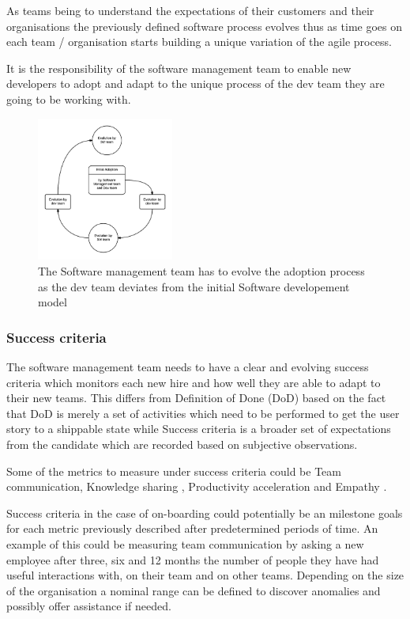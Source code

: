 \documentclass[12pt,conference]{IEEEtran}
\begin{document}
As teams being to understand the expectations of their customers and their organisations the previously defined software process evolves thus as time goes on each team / organisation starts building a unique variation of the agile process.

It is the responsibility of the software management team to enable new developers to adopt and adapt to the unique process of the dev team they are going to be working with.

\begin{figure}[t]
\centering
\includegraphics[width=0.4\textwidth]{sm_dev_team_process_evolution.png}
\caption{The Software management team has to evolve the adoption process as the dev team deviates from the initial Software developement model}
\end{figure}

\subsubsection*{Success criteria} The software management team needs to have a clear and evolving success criteria which monitors each new hire and how well they are able to adapt to their new teams. This differs from Definition of Done (DoD) based on the fact that DoD is merely a set of activities which need to be performed to get the user story to a shippable state while Success criteria is a broader set of expectations from the candidate which are recorded based on subjective observations. 

Some of the metrics to measure under success criteria could be Team communication, Knowledge sharing \cite{cabrera_fostering_2005}, Productivity acceleration \cite{grote_making_2011} and Empathy \cite{seppala_hard_2014}.

Success criteria in the case of on-boarding could potentially be an milestone goals for each metric previously described after predetermined periods of time. An example of this could be measuring team communication by asking a new employee after three, six and 12 months the number of people they have had useful interactions with, on their team and on other teams. Depending on the size of the organisation a nominal range can be defined to discover anomalies and possibly offer assistance if needed.
\end{document}
